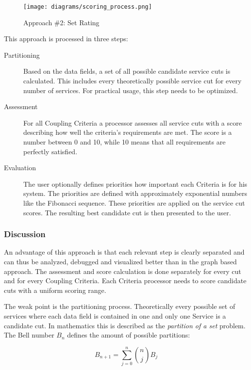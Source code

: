 \begin{figure}[H]
	\begin{center}
		\texttt{[image: diagrams/scoring\_process.png]}
	\end{center}
	\caption{Approach \#2: Set Rating}
	\label{fig:setProcess}
\end{figure}

This approach is processed in three steps:

\begin{description}
	\item[Partitioning] Based on the data fields, a set of all possible candidate service cuts is calculated. This includes every theoretically possible service cut for every number of services. For practical usage, this step needs to be optimized. 
	\item[Assessment] For all Coupling Criteria a processor assesses all service cuts with a score describing how well the criteria's requirements are met. The score is a number between 0 and 10, while 10 means that all requirements are perfectly satisfied. 
	\item[Evaluation] The user optionally defines priorities how important each Criteria is for his system. The priorities are defined with approximately exponential numbers like the Fibonacci sequence. These priorities are applied on the service cut scores. The resulting best candidate cut is then presented to the user.
\end{description}

\subsubsection{Discussion}

An advantage of this approach is that each relevant step is clearly separated and can thus be analyzed, debugged and visualized better than in the graph based approach. The assessment and score calculation is done separately for every cut and for every Coupling Criteria. Each Criteria processor needs to score candidate cuts with a uniform scoring range. 

The weak point is the partitioning process. Theoretically every possible set of services where each data field is contained in one and only one Service is a candidate cut. In mathematics this is described as the \textit{partition of a set}\cite{partitionOfASet} problem. The Bell number $B_n$ defines the amount of possible partitions: 


\begin{displaymath}
B_{n+1}=\sum_{j=0}^n {n\choose j} B_j
\end{displaymath}

